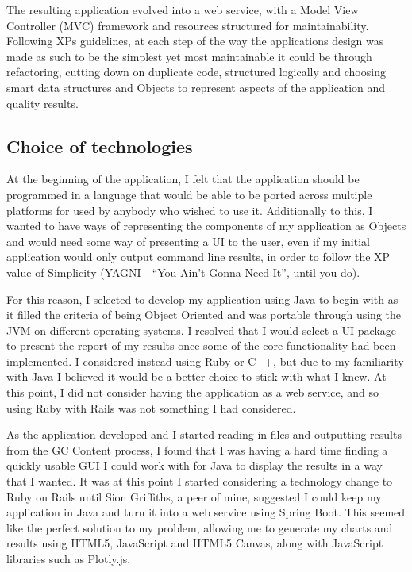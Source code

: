 The resulting application evolved into a web service, with a Model View Controller (MVC) framework and resources structured for maintainability. Following XPs guidelines, at each step of the way the applications design was made as such to be the simplest yet most maintainable it could be through refactoring, cutting down on duplicate code, structured logically and choosing smart data structures and Objects to represent aspects of the application and quality results.

\subsection{Choice of technologies}
At the beginning of the application, I felt that the application should be programmed in a language that would be able to be ported across multiple platforms for used by anybody who wished to use it. Additionally to this, I wanted to have ways of representing the components of my application as Objects and would need some way of presenting a UI to the user, even if my initial application would only output command line results, in order to follow the XP value of Simplicity (YAGNI - ``You Ain't Gonna Need It'', until you do).

For this reason, I selected to develop my application using Java to begin with as it filled the criteria of being Object Oriented and was portable through using the JVM on different operating systems. I resolved that I would select a UI package to present the report of my results once some of the core functionality had been implemented. I considered instead using Ruby or C++, but due to my familiarity with Java I believed it would be a better choice to stick with what I knew. At this point, I did not consider having the application as a web service, and so using Ruby with Rails was not something I had considered.

As the application developed and I started reading in files and outputting results from the GC Content process, I found that I was having a hard time finding a quickly usable GUI I could work with for Java to display the results in a way that I wanted. It was at this point I started considering a technology change to Ruby on Rails until Sion Griffiths, a peer of mine, suggested I could keep my application in Java and turn it into a web service using Spring Boot\cite{springboot}. This seemed like the perfect solution to my problem, allowing me to generate my charts and results using HTML5, JavaScript and HTML5 Canvas, along with JavaScript libraries such as Plotly.js.

